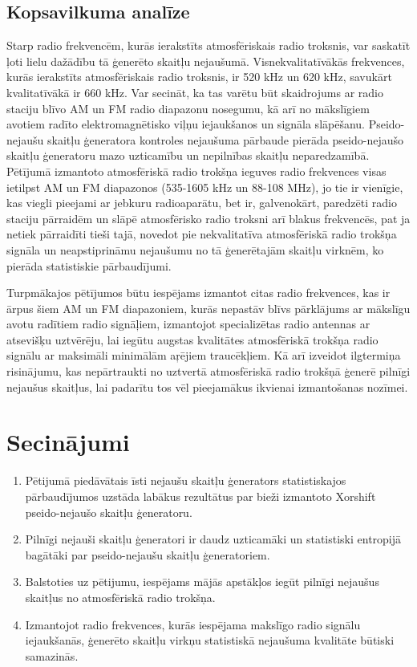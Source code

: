 \documentclass[12pt]{article}
\begin{document}
    \subsection{Kopsavilkuma analīze}
    Starp radio frekvencēm, kurās ierakstīts atmosfēriskais radio troksnis, var saskatīt ļoti lielu dažādību tā ģenerēto skaitļu nejaušumā. Visnekvalitatīvākās frekvences, kurās ierakstīts atmosfēriskais radio troksnis, ir 520 kHz un 620 kHz, savukārt kvalitatīvākā ir 660 kHz. Var secināt, ka tas varētu būt skaidrojums ar radio staciju blīvo AM un FM radio diapazonu nosegumu, kā arī no mākslīgiem avotiem radīto elektromagnētisko viļņu iejaukšanos un signāla slāpēšanu. Pseido-nejaušu skaitļu ģeneratora kontroles nejaušuma pārbaude pierāda pseido-nejaušo skaitļu ģeneratoru mazo uzticamību un nepilnības skaitļu neparedzamībā. Pētījumā izmantoto atmosfēriskā radio trokšņa ieguves radio frekvences visas ietilpst AM un FM diapazonos (535-1605 kHz un 88-108 MHz), jo tie ir vienīgie, kas viegli pieejami ar jebkuru radioaparātu, bet ir, galvenokārt, paredzēti radio staciju pārraidēm un slāpē atmosfērisko radio troksni arī blakus frekvencēs, pat ja netiek pārraidīti tieši tajā, novedot pie nekvalitatīva atmosfēriskā radio trokšņa signāla un neapstiprināmu nejaušumu no tā ģenerētajām skaitļu virknēm, ko pierāda statistiskie pārbaudījumi. 
    \par
    Turpmākajos pētījumos būtu iespējams izmantot citas radio frekvences, kas ir ārpus šiem AM un FM diapazoniem, kurās nepastāv blīvs pārklājums ar mākslīgu avotu radītiem radio signāļiem, izmantojot specializētas radio antennas ar atsevišķu uztvērēju, lai iegūtu augstas kvalitātes atmosfēriskā trokšņa radio signālu ar maksimāli minimālām aŗējiem traucēkļiem. Kā arī izveidot ilgtermiņa risinājumu, kas nepārtraukti no uztvertā atmosfēriskā radio trokšņā ģenerē pilnīgi nejaušus skaitļus, lai padarītu tos vēl pieejamākus ikvienai izmantošanas nozīmei.

    \pagebreak
    \section{Secinājumi}
    \begin{enumerate}
        \item Pētijumā piedāvātais īsti nejaušu skaitļu ģenerators statistiskajos pārbaudījumos uzstāda labākus rezultātus par bieži izmantoto Xorshift pseido-nejaušo skaitļu ģeneratoru.
        \item Pilnīgi nejauši skaitļu ģeneratori ir daudz uzticamāki un statistiski entropijā bagātāki par pseido-nejaušu skaitļu ģeneratoriem.
        \item Balstoties uz pētijumu, iespējams mājās apstākļos iegūt pilnīgi nejaušus skaitļus no atmosfēriskā radio trokšņa.
        \item Izmantojot radio frekvences, kurās iespējama makslīgo radio signālu iejaukšanās, ģenerēto skaitļu virkņu statistiskā nejaušuma kvalitāte būtiski samazinās.
    \end{enumerate}
    
\end{document}
